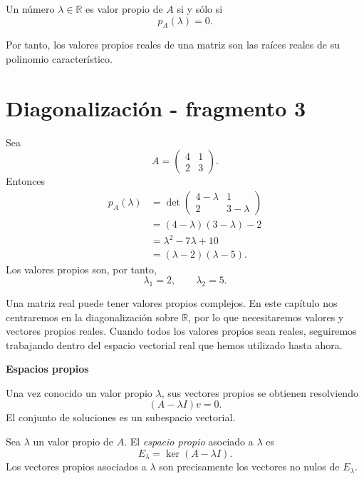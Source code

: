 \begin{theorem}
Un número $\lambda\in\mathbb{R}$ es valor propio de $A$ si y sólo si
\[
p_A(\lambda)=0.
\]
\end{theorem}

Por tanto, los valores propios reales de una matriz son las raíces reales de su polinomio característico.


\section{Diagonalización - fragmento 3}
\begin{example}
Sea
\[
A=\begin{pmatrix}
4&1\\
2&3
\end{pmatrix}.
\]
Entonces
\[
\begin{aligned}
p_A(\lambda)
&=\det\begin{pmatrix}4-\lambda&1\\2&3-\lambda\end{pmatrix}\\
&=(4-\lambda)(3-\lambda)-2\\
&=\lambda^2-7\lambda+10\\
&=(\lambda-2)(\lambda-5).
\end{aligned}
\]
Los valores propios son, por tanto,
\[
\boxed{\lambda_1=2,\qquad \lambda_2=5.}
\]
\end{example}

Una matriz real puede tener valores propios complejos. En este capítulo nos centraremos en la diagonalización sobre $\mathbb{R}$, por lo que necesitaremos valores y vectores propios reales. Cuando todos los valores propios sean reales, seguiremos trabajando dentro del espacio vectorial real que hemos utilizado hasta ahora.

\textbf{Espacios propios}

Una vez conocido un valor propio $\lambda$, sus vectores propios se obtienen resolviendo
\[
(A-\lambda I)v=0.
\]
El conjunto de soluciones es un subespacio vectorial.

\begin{definition}
Sea $\lambda$ un valor propio de $A$. El \emph{espacio propio} asociado a $\lambda$ es
\[
E_{\lambda}=\ker(A-\lambda I).
\]
Los vectores propios asociados a $\lambda$ son precisamente los vectores no nulos de $E_\lambda$.
\end{definition}

